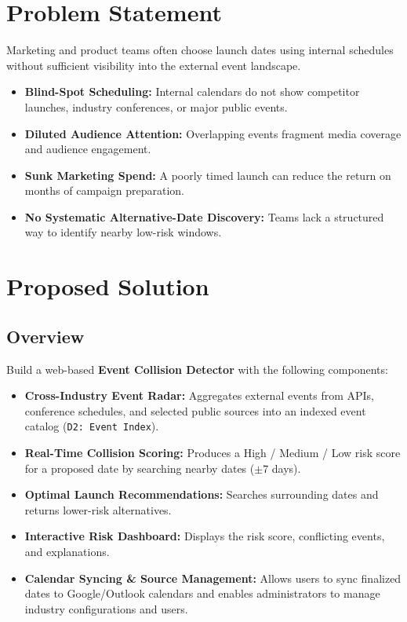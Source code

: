 \documentclass[12pt]{article}
\begin{document}
\section{Problem Statement}
Marketing and product teams often choose launch dates using internal schedules without sufficient visibility into the external event landscape.
\begin{itemize}[leftmargin=0.7cm]
\item \textbf{Blind-Spot Scheduling:} Internal calendars do not show competitor launches, industry conferences, or major public events.
\item \textbf{Diluted Audience Attention:} Overlapping events fragment media coverage and audience engagement.
\item \textbf{Sunk Marketing Spend:} A poorly timed launch can reduce the return on months of campaign preparation.
\item \textbf{No Systematic Alternative-Date Discovery:} Teams lack a structured way to identify nearby low-risk windows.
\end{itemize}

\section{Proposed Solution}
\subsection{Overview}
Build a web-based \textbf{Event Collision Detector} with the following components:
\begin{itemize}[leftmargin=0.7cm]
\item \textbf{Cross-Industry Event Radar:} Aggregates external events from APIs, conference schedules, and selected public sources into an indexed event catalog (\texttt{D2: Event Index}).
\item \textbf{Real-Time Collision Scoring:} Produces a High / Medium / Low risk score for a proposed date by searching nearby dates ($\pm 7$ days).
\item \textbf{Optimal Launch Recommendations:} Searches surrounding dates and returns lower-risk alternatives.
\item \textbf{Interactive Risk Dashboard:} Displays the risk score, conflicting events, and explanations.
\item \textbf{Calendar Syncing \& Source Management:} Allows users to sync finalized dates to Google/Outlook calendars and enables administrators to manage industry configurations and users.
\end{itemize}
\end{document}
